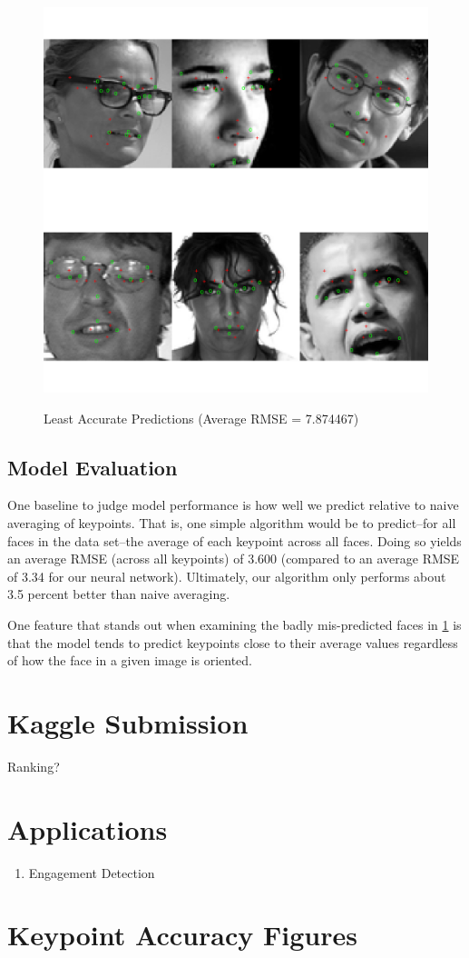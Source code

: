 \documentclass[journal]{IEEEtran}
\begin{document}
\begin{figure}[!htb]
  \centering
  \caption{Least Accurate Predictions (Average RMSE = 7.874467)}
  \includegraphics[scale=.6]{worst_faces.pdf}
  \label{fig:worst_faces}
\end{figure}

\subsection{Model Evaluation}

One baseline to judge model performance is how well we predict relative to naive averaging of keypoints. That is, one simple algorithm would be to predict--for all faces in the data set--the average of each keypoint across all faces. Doing so yields an average RMSE (across all keypoints) of 3.600 (compared to an average RMSE of 3.34 for our neural network). Ultimately, our algorithm only performs about 3.5 percent better than naive averaging.

One feature that stands out when examining the badly mis-predicted faces in \cref{fig:worst_faces} is that the model tends to predict keypoints close to their average values regardless of how the face in a given image is oriented.

\section{Kaggle Submission}
Ranking?

\section{Applications}
\begin{enumerate}
\item Engagement Detection
\end{enumerate}

\appendices
\section{Keypoint Accuracy Figures}




\medskip


% 

\end{document}
